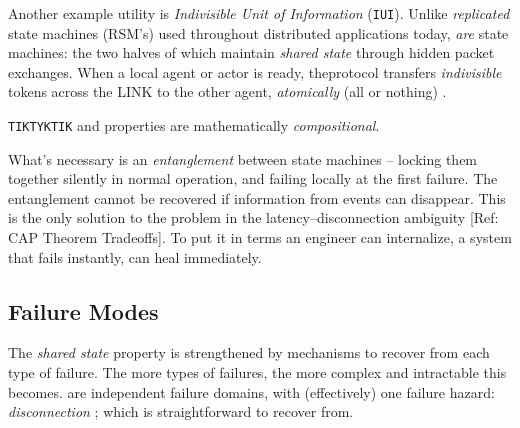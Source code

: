 \documentclass[../../../OAE-SPEC-MAIN.tex]{subfiles}
\begin{document}
Another example \LINK utility is \emph{Indivisible Unit of Information} (\texttt{IUI}). Unlike \emph{replicated} state machines (RSM's) used throughout distributed applications today, \LINKs \emph{are} state machines: the two halves of which maintain \emph{shared state} through hidden packet exchanges.  When a local agent or actor is ready, the\IUI protocol transfers \emph{indivisible}
tokens across the LINK to  the other agent, \emph{atomically} (all or nothing)
. 
 
\noindent  \texttt{TIK\hspace{1pt}TYK\hspace{1pt}TIK} and \IUI properties are mathematically \emph{compositional}. 

What's necessary is an \emph{entanglement} between state machines -- locking them together silently in normal operation, and failing locally at the first failure.  The entanglement cannot be recovered if information from events can disappear. This is the only solution to the problem in the  latency--disconnection ambiguity [Ref: CAP Theorem Tradeoffs]. To put it in terms an engineer can internalize, a system that fails instantly, can heal immediately.


\subsection{Failure Modes}

The \emph{shared state} property %
is strengthened by mechanisms to recover from each type of failure. The more types of failures, the more complex and intractable this becomes. \LINKs are independent failure domains, with (effectively) one failure hazard: \emph{disconnection} ; which is straightforward to recover from.
\end{document}
